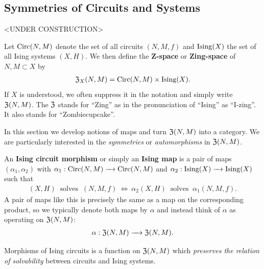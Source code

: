 \documentclass{article}
\begin{document}
\subsection{Symmetries of Circuits and Systems}
<UNDER CONSTRUCTION>

Let $\operatorname{Circ}(N,M)$ denote the set of all circuits $(N,M,f)$ and $\operatorname{Ising}(X)$ the set of all Ising systems $(X, H)$. We then define the \textbf{Z-space} or \textbf{Zing-space} of $N, M \subset X$ by
\begin{align*}
  \operatorname{\mathfrak{Z}}_X(N,M) = \operatorname{Circ}(N,M)\times \operatorname{Ising}(X).
\end{align*}
If $X$ is understood, we often suppress it in the notation and simply write $\operatorname{\mathfrak{Z}}(N,M)$. The $\operatorname{\mathfrak{Z}}$ stands for ``Zing'' as in the pronunciation of ``Ising'' as ``I-zing''. It also stands for ``Zombiecupcake''.

In this section we develop notions of maps and turn $\operatorname{\mathfrak{Z}}(N,M)$ into a category. We are particularly interested in the \emph{symmetries} or \emph{automorphisms} in $\operatorname{\mathfrak{Z}}(N,M)$.

\begin{defn}\label{defn:ising-symmetry}
  An \textbf{Ising circuit morphism} or simply an \textbf{Ising map} is a pair of maps $(\alpha_1, \alpha_2)$ with $\alpha_1:\Circ(N,M) \to \Circ(N,M)$ and $\alpha_2:\Ising(X) \to \Ising(X)$ such that
  \begin{align*}
    (X,H) ~ \text{ solves } ~ (N,M,f) ~ \Leftrightarrow~ \alpha_2(X,H) ~ \text{ solves } ~ \alpha_1(N,M,f).
  \end{align*}
  A pair of maps like this is precisely the same as a map on the corresponding product, so we typically denote both maps by $\alpha$ and instead think of $\alpha$ as operating on $\operatorname{\mathfrak{Z}}(N,M)$:
  \begin{align*}
    \alpha: \Zing(N,M) \to \Zing(N,M).
  \end{align*}
\end{defn}

Morphisms of Ising circuits is a function on $\operatorname{\mathfrak{Z}}(N,M)$ which \emph{preserves the relation of solvability} between circuits and Ising systems.
\end{document}
